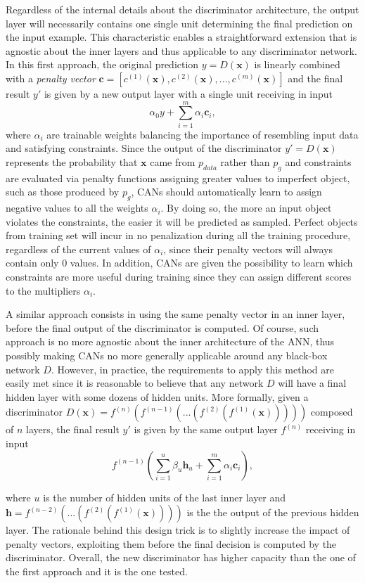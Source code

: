 Regardless of the internal details about the discriminator architecture, the output layer will necessarily contains one single unit determining the final prediction on the input example. This characteristic enables a straightforward extension that is agnostic about the inner layers and thus applicable to any discriminator network. In this first approach, the original prediction $y = D(\bm{x})$ is linearly combined with a \textit{penalty vector} $\bm{c} = [c^{(1)}(\bm{x}), c^{(2)}(\bm{x}), ..., c^{(m)}(\bm{x})]$ and the final result $y'$ is given by a new output layer with a single unit receiving in input
\[
\alpha_0y + \sum\limits_{i=1}^m \alpha_i\bm{c}_i,
\]
where $\alpha_i$ are trainable weights balancing the importance of resembling input data and satisfying constraints. Since the output of the discriminator $y'=D(\bm{x})$ represents the probability that $\bm{x}$ came from $p_{data}$  rather than $p_g$ and constraints are evaluated via penalty functions assigning greater values to imperfect object, such as those produced by $p_g$, CANs should automatically learn to assign negative values to all the weights $\alpha_i$. By doing so, the more an input object violates the constraints, the easier it will be predicted as sampled. Perfect objects from training set will incur in no penalization during all the training procedure, regardless of the current values of $\alpha_i$, since their penalty vectors will always contain only $0$ values. In addition, CANs are given the possibility to learn which constraints are more useful during training since they can assign different scores to the multipliers $\alpha_i$.

A similar approach consists in using the same penalty vector in an inner layer, before the final output of the discriminator is computed. Of course, such approach is no more agnostic about the inner architecture of the ANN, thus possibly making CANs no more generally applicable around any black-box network $D$. However, in practice, the requirements to apply this method are easily met since it is reasonable to believe that any network $D$ will have a final hidden layer with some dozens of hidden units. More formally, given a discriminator $D(\bm{x}) = f^{(n)}(f^{(n-1)}(...(f^{(2)}(f^{(1)}(\bm{x})))))$ composed of $n$ layers, the final result $y'$ is given by the same output layer $f^{(n)}$ receiving in input
\[
f^{(n-1)}(\sum\limits_{i=1}^u \beta_u \bm{h}_u + \sum\limits_{i=1}^m \alpha_i\bm{c}_i),
\]

where $u$ is the number of hidden units of the last inner layer and $\bm{h} = f^{(n-2)}(...(f^{(2)}(f^{(1)}(\bm{x}))))$ is the the output of the previous hidden layer. The rationale behind this design trick is to slightly increase the impact of penalty vectors, exploiting them before the final decision is computed by the discriminator. Overall, the new discriminator has higher capacity than the one of the first approach and it is the one tested.


